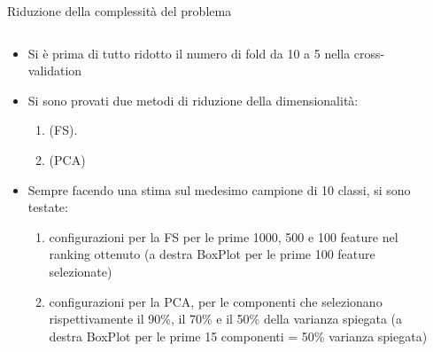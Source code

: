 \documentclass[9pt]{beamer}
\begin{document}
\begin{tframe}{Riduzione della complessità del problema}

\begin{columns}
    \begin{column}{.60\textwidth}
      \minipage[c][0.4\textheight][s]{\columnwidth}
		\begin{itemize}
				\item Si è prima di tutto ridotto il numero di fold da 10 a 5 nella cross-validation
			\onslide<2->
				\item Si sono provati due metodi di riduzione della dimensionalità:
				\begin{enumerate}
					\item {} (FS).
				\onslide<4->
					\item {} (PCA)
				\end{enumerate}
		\item Sempre facendo una stima sul medesimo campione di 10 classi, si sono testate:
		\begin{enumerate}
		\item configurazioni per la FS per le prime 1000, 500 e 100 feature nel ranking ottenuto (a destra BoxPlot per le prime 100 feature selezionate) 
		\onslide<6->
		\item configurazioni per la PCA, per le componenti che selezionano rispettivamente il 90\%, il 70\% e il 50\% della varianza spiegata (a destra BoxPlot per le prime 15 componenti = 50\% varianza spiegata)
		\end{enumerate}
		\end{itemize}	
	 \endminipage
	\end{column}
	
	\begin{column}{.40\textwidth}
      \end{column} 
\end{columns}
\end{tframe}
\end{document}
